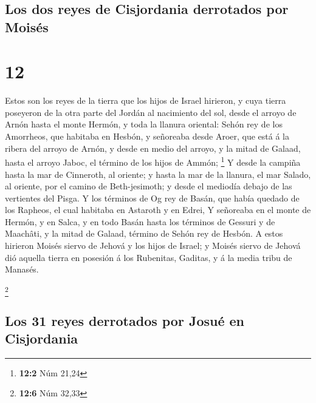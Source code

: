 \hypertarget{los-dos-reyes-de-cisjordania-derrotados-por-moisuxe9s}{%
\subsection{Los dos reyes de Cisjordania derrotados por
Moisés}\label{los-dos-reyes-de-cisjordania-derrotados-por-moisuxe9s}}

\hypertarget{section-11}{%
\section{12}\label{section-11}}

 Estos son los reyes de la tierra que los hijos de Israel
hirieron, y cuya tierra poseyeron de la otra parte del Jordán al
nacimiento del sol, desde el arroyo de Arnón hasta el monte Hermón, y
toda la llanura oriental:  Sehón rey de los Amorrheos, que
habitaba en Hesbón, y señoreaba desde Aroer, que está á la ribera del
arroyo de Arnón, y desde en medio del arroyo, y la mitad de Galaad,
hasta el arroyo Jaboc, el término de los hijos de Ammón; \footnote{\textbf{12:2}
  Núm 21,24}  Y desde la campiña hasta la mar de
Cinneroth, al oriente; y hasta la mar de la llanura, el mar Salado, al
oriente, por el camino de Beth-jesimoth; y desde el mediodía debajo de
las vertientes del Pisga.  Y los términos de Og rey de
Basán, que había quedado de los Rapheos, el cual habitaba en Astaroth y
en Edrei,  Y señoreaba en el monte de Hermón, y en Salca,
y en todo Basán hasta los términos de Gessuri y de Maachâti, y la mitad
de Galaad, término de Sehón rey de Hesbón.  A estos
hirieron Moisés siervo de Jehová y los hijos de Israel; y Moisés siervo
de Jehová dió aquella tierra en posesión á los Rubenitas, Gaditas, y á
la media tribu de Manasés.

\footnote{\textbf{12:6} Núm 32,33}

\hypertarget{los-31-reyes-derrotados-por-josuuxe9-en-cisjordania}{%
\subsection{Los 31 reyes derrotados por Josué en
Cisjordania}\label{los-31-reyes-derrotados-por-josuuxe9-en-cisjordania}}

